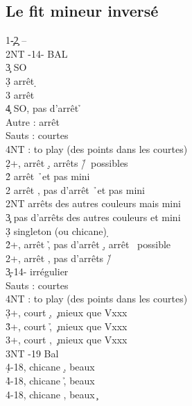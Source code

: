 \documentclass[a4paper]{article}
\begin{document}
\subsection{Le fit mineur inversé}

\begin{bidtable}
1\c-2\c \> --\\
2NT -14- BAL\+\\
3\c \> SO\\
3\d \> arrêt \d \+\\
3\s \> arrêt \s \+\\
4\c \> SO, pas d'arrêt \h \-\-\\
Autre \> : arrêt\\
Sauts \> : courtes\+\\
4NT \> : to play (des points dans les courtes)\-\-\\
2\d {}+, arrêt \d , arrêts \h /\s\ possibles\+\\
2\h \> arrêt \h\ et pas mini\\
2\s \> arrêt \s , pas d'arrêt \h\ et pas mini\\
2NT \> arrêts des autres couleurs mais mini\\
3\c \> pas d'arrêts des autres couleurs et mini\\
3\d \> singleton (ou chicane) \d \-\\
2\h {}+, arrêt \h , pas d'arrêt \d , arrêt \s\ possible\\
2\s {}+, arrêt \s , pas d'arrêts \h /\d \\
3\c {}-14- irrégulier\+\\
Sauts \> : courtes\+\\
4NT \> : to play (des points dans les courtes)\-\-\\
3\d {}+, court \d , \c\ mieux que Vxxx\\
3\h {}+, court \h , \c\ mieux que Vxxx\\
3\s {}+, court \s , \c\ mieux que Vxxx\\
3NT -19 Bal\\
4\d {}-18, chicane \d , beaux \c \\
4\h {}-18, chicane \h , beaux \c \\
4\s {}-18, chicane \s , beaux \c 
\end{bidtable}
\end{document}
